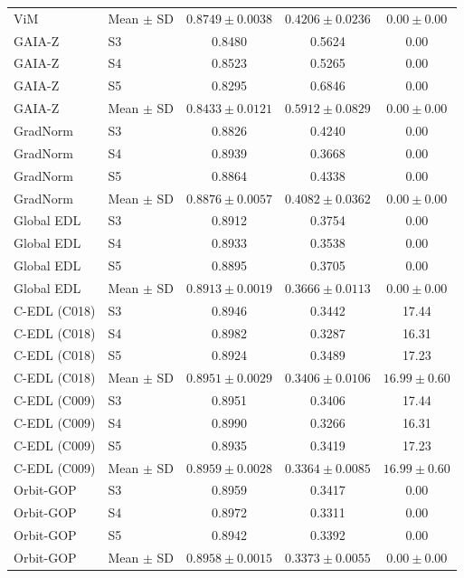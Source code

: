 \begin{longtable}{@{}llccc@{}}
ViM & Mean $\pm$ SD & $0.8749 \pm 0.0038$ & $0.4206 \pm 0.0236$ & $0.00 \pm 0.00$ \\
GAIA-Z & S3 & 0.8480 & 0.5624 & 0.00 \\
GAIA-Z & S4 & 0.8523 & 0.5265 & 0.00 \\
GAIA-Z & S5 & 0.8295 & 0.6846 & 0.00 \\
GAIA-Z & Mean $\pm$ SD & $0.8433 \pm 0.0121$ & $0.5912 \pm 0.0829$ & $0.00 \pm 0.00$ \\
GradNorm & S3 & 0.8826 & 0.4240 & 0.00 \\
GradNorm & S4 & 0.8939 & 0.3668 & 0.00 \\
GradNorm & S5 & 0.8864 & 0.4338 & 0.00 \\
GradNorm & Mean $\pm$ SD & $0.8876 \pm 0.0057$ & $0.4082 \pm 0.0362$ & $0.00 \pm 0.00$ \\
Global EDL & S3 & 0.8912 & 0.3754 & 0.00 \\
Global EDL & S4 & 0.8933 & 0.3538 & 0.00 \\
Global EDL & S5 & 0.8895 & 0.3705 & 0.00 \\
Global EDL & Mean $\pm$ SD & $0.8913 \pm 0.0019$ & $0.3666 \pm 0.0113$ & $0.00 \pm 0.00$ \\
C-EDL (C018) & S3 & 0.8946 & 0.3442 & 17.44 \\
C-EDL (C018) & S4 & 0.8982 & 0.3287 & 16.31 \\
C-EDL (C018) & S5 & 0.8924 & 0.3489 & 17.23 \\
C-EDL (C018) & Mean $\pm$ SD & $0.8951 \pm 0.0029$ & $0.3406 \pm 0.0106$ & $16.99 \pm 0.60$ \\
C-EDL (C009) & S3 & 0.8951 & 0.3406 & 17.44 \\
C-EDL (C009) & S4 & 0.8990 & 0.3266 & 16.31 \\
C-EDL (C009) & S5 & 0.8935 & 0.3419 & 17.23 \\
C-EDL (C009) & Mean $\pm$ SD & $0.8959 \pm 0.0028$ & $0.3364 \pm 0.0085$ & $16.99 \pm 0.60$ \\
Orbit-GOP & S3 & 0.8959 & 0.3417 & 0.00 \\
Orbit-GOP & S4 & 0.8972 & 0.3311 & 0.00 \\
Orbit-GOP & S5 & 0.8942 & 0.3392 & 0.00 \\
Orbit-GOP & Mean $\pm$ SD & $0.8958 \pm 0.0015$ & $0.3373 \pm 0.0055$ & $0.00 \pm 0.00$ \\
\end{longtable}
\endgroup

\clearpage
